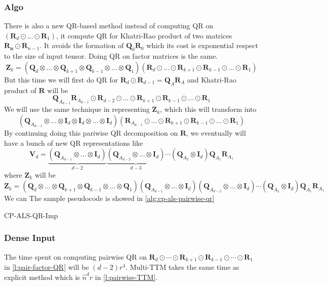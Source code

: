 \documentclass{article}
\newcommand{\mat}[1]{\mathbf{#1}}
\begin{document}
\subsubsection{Algo}
There is also a new QR-based method instead of computing QR on $(\mat{R}_d \odot \dots \odot \mat{R}_1)$, it compute QR for Khatri-Rao product of two matrices $\mat{R_n} \odot \mat{R}_{n-1}$.
It avoids the formation of $\mat{Q}_0\mat{R}_0$ which its cost is exponential respect to the size of input tensor.
Doing QR on factor matrices is the same.
$$\mat{Z}_k = (\mat{Q}_d \otimes \dots \otimes \mat{Q}_{k+1} \otimes \mat{Q}_{k-1} \otimes \dots \otimes \mat{Q}_1)(\mat{R}_d \odot \dots \odot \mat{R}_{k+1} \odot \mat{R}_{k-1} \odot \dots \odot \mat{R}_1)$$
But this time we will first do QR for $\mat{R}_d \odot \mat{R}_{d-1} = \mat{Q}_{A}\mat{R}_A$ and Khatri-Rao product of $\mat{R}$ will be 
$$\mat{Q}_{A_{d-1}}\mat{R}_{A_{d-1}} \odot \mat{R}_{d-2} \odot \dots \odot \mat{R}_{k+1} \odot \mat{R}_{k-1} \odot \dots \odot \mat{R}_1$$
We will use the same technique in representing $\mat{Z}_k$, which this will transform into 
$$(\mat{Q}_{A_{d-1}} \otimes \dots \otimes \mat{I}_d \otimes \mat{I}_d \otimes \dots  \otimes  \mat{I}_d)(\mat{R}_{A_{d-1}} \odot \dots \odot \mat{R}_{k+1} \odot \mat{R}_{k-1} \odot \dots \odot \mat{R}_1)$$
By continuing doing this pariwise QR decomposition on $\mat{R}$, we eventually will have a bunch of new QR representations like
$$\mat{V}_d = \underbrace{(\mat{Q}_{A_{d-1}} \otimes \dots  \otimes  \mat{I}_d)}_{d-2}\underbrace{(\mat{Q}_{A_{d-2}} \otimes \dots \otimes \mat{I}_d)}_{d-3} \cdots (\mat{Q}_{A_{2}} \otimes \mat{I}_d) \mat{Q}_{A_{1}}\mat{R}_{A_{1}}$$
where $\mat{Z}_k$ will be 
$$\mat{Z}_k = (\mat{Q}_d \otimes \dots \otimes \mat{Q}_{k+1} \otimes \mat{Q}_{k-1} \otimes \dots \otimes \mat{Q}_1) (\mat{Q}_{A_{d-1}} \otimes \dots  \otimes  \mat{I}_d)(\mat{Q}_{A_{d-2}} \otimes \dots \otimes \mat{I}_d) \cdots (\mat{Q}_{A_{2}} \otimes \mat{I}_d) \mat{Q}_{A_{1}}\mat{R}_{A_{1}}$$
We can 
The sample pseudocode is showed in \cref{alg:cp-als-pairwise-qr} 
\begin{algorithm}
  \caption{CP-ALS-QR-Imp}
  \label{alg:cp-als-pairwise-qr}
  
\end{algorithm}
\subsubsection{Dense Input}

The time spent on computing pairwise QR on $\mat{R}_d \odot \cdots \odot \mat{R}_{k+1} \odot \mat{R}_{k-1} \odot \cdots \odot \mat{R}_1$ in \cref{l:pair-factor-QR} will be $(d-2)r^4$.
Multi-TTM takes the same time as explicit method which is $\hat n^d r$ in \cref{l:pairwise-TTM}.
\end{document}
